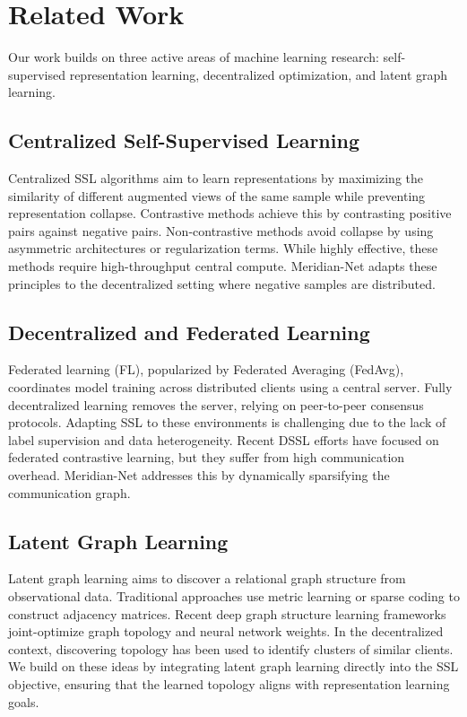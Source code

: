 \section{Related Work}
Our work builds on three active areas of machine learning research: self-supervised representation learning, decentralized optimization, and latent graph learning.

\subsection{Centralized Self-Supervised Learning}
Centralized SSL algorithms aim to learn representations by maximizing the similarity of different augmented views of the same sample while preventing representation collapse. Contrastive methods \cite{aurelius2023contrastive} achieve this by contrasting positive pairs against negative pairs. Non-contrastive methods avoid collapse by using asymmetric architectures or regularization terms. While highly effective, these methods require high-throughput central compute. Meridian-Net adapts these principles to the decentralized setting where negative samples are distributed.

\subsection{Decentralized and Federated Learning}
Federated learning (FL), popularized by Federated Averaging (FedAvg), coordinates model training across distributed clients using a central server. Fully decentralized learning removes the server, relying on peer-to-peer consensus protocols. Adapting SSL to these environments is challenging due to the lack of label supervision and data heterogeneity. Recent DSSL efforts have focused on federated contrastive learning, but they suffer from high communication overhead. Meridian-Net addresses this by dynamically sparsifying the communication graph.

\subsection{Latent Graph Learning}
Latent graph learning aims to discover a relational graph structure from observational data. Traditional approaches use metric learning or sparse coding to construct adjacency matrices. Recent deep graph structure learning frameworks joint-optimize graph topology and neural network weights. In the decentralized context, discovering topology has been used to identify clusters of similar clients. We build on these ideas by integrating latent graph learning directly into the SSL objective, ensuring that the learned topology aligns with representation learning goals.
